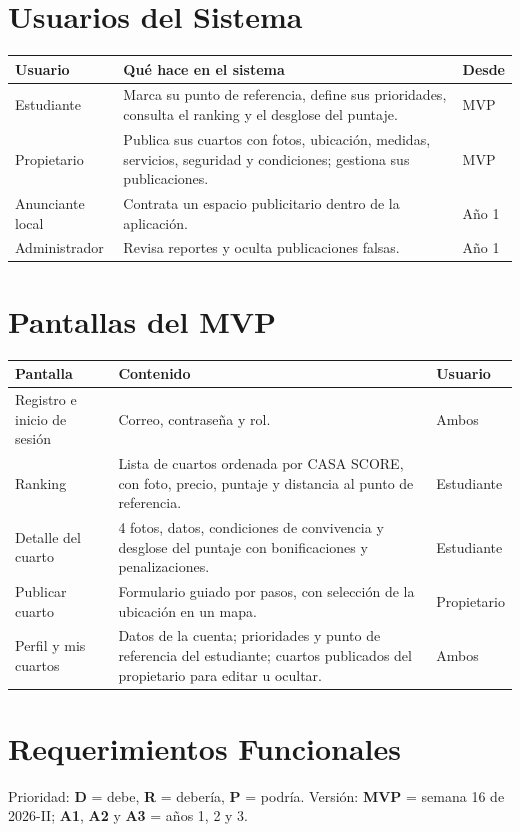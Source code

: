 \documentclass[11pt,a4paper]{article}
\begin{document}
\section{Usuarios del Sistema}
{\small
\noindent\begin{tabularx}{\textwidth}{@{}P{3.0cm} L C{1.6cm}@{}}
\toprule
{}
\textbf{Usuario} & \textbf{Qué hace en el sistema} & \textbf{Desde} \\
\midrule
Estudiante & Marca su punto de referencia, define sus prioridades, consulta el ranking y el desglose del puntaje. & MVP \\
Propietario & Publica sus cuartos con fotos, ubicación, medidas, servicios, seguridad y condiciones; gestiona sus publicaciones. & MVP \\
Anunciante local & Contrata un espacio publicitario dentro de la aplicación. & Año 1 \\
Administrador & Revisa reportes y oculta publicaciones falsas. & Año 1 \\
\bottomrule
\end{tabularx}
}

\section{Pantallas del MVP}
{\small
\noindent\begin{tabularx}{\textwidth}{@{}P{3.6cm} L P{2.0cm}@{}}
\toprule
{}
\textbf{Pantalla} & \textbf{Contenido} & \textbf{Usuario} \\
\midrule
Registro e inicio de sesión & Correo, contraseña y rol. & Ambos \\
Ranking & Lista de cuartos ordenada por CASA SCORE, con foto, precio, puntaje y distancia al punto de referencia. & Estudiante \\
Detalle del cuarto & 4 fotos, datos, condiciones de convivencia y desglose del puntaje con bonificaciones y penalizaciones. & Estudiante \\
Publicar cuarto & Formulario guiado por pasos, con selección de la ubicación en un mapa. & Propietario \\
Perfil y mis cuartos & Datos de la cuenta; prioridades y punto de referencia del estudiante; cuartos publicados del propietario para editar u ocultar. & Ambos \\
\bottomrule
\end{tabularx}
}

\section{Requerimientos Funcionales}
Prioridad: \textbf{D} = debe, \textbf{R} = debería, \textbf{P} = podría. Versión: \textbf{MVP} = semana 16 de 2026-II; \textbf{A1}, \textbf{A2} y \textbf{A3} = años 1, 2 y 3.
\end{document}
